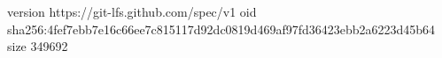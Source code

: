 version https://git-lfs.github.com/spec/v1
oid sha256:4fef7ebb7e16c66ee7c815117d92dc0819d469af97fd36423ebb2a6223d45b64
size 349692
